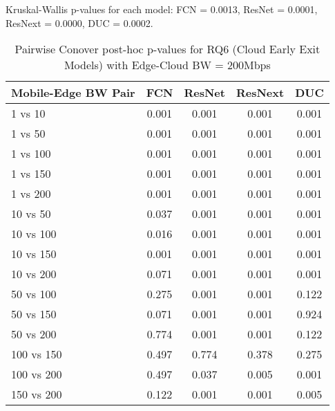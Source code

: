 \begin{table}[h]
\centering
\caption{Pairwise Conover post-hoc p-values for RQ6 (Cloud Early Exit Models) with Edge-Cloud BW = 200Mbps}
\label{tab:conover_cloud_earlyexit_ec200}
\smallskip
Kruskal-Wallis p-values for each model: FCN = 0.0013, ResNet = 0.0001, ResNext = 0.0000, DUC = 0.0002.

\begin{tabular}{lcccc}
\toprule
Mobile-Edge BW Pair & FCN & ResNet & ResNext & DUC \\
\midrule
1 vs 10 & 0.001 & 0.001 & 0.001 & 0.001 \\
1 vs 50 & 0.001 & 0.001 & 0.001 & 0.001 \\
1 vs 100 & 0.001 & 0.001 & 0.001 & 0.001 \\
1 vs 150 & 0.001 & 0.001 & 0.001 & 0.001 \\
1 vs 200 & 0.001 & 0.001 & 0.001 & 0.001 \\
10 vs 50 & 0.037 & 0.001 & 0.001 & 0.001 \\
10 vs 100 & 0.016 & 0.001 & 0.001 & 0.001 \\
10 vs 150 & 0.001 & 0.001 & 0.001 & 0.001 \\
10 vs 200 & 0.071 & 0.001 & 0.001 & 0.001 \\
50 vs 100 & 0.275 & 0.001 & 0.001 & 0.122 \\
50 vs 150 & 0.071 & 0.001 & 0.001 & 0.924 \\
50 vs 200 & 0.774 & 0.001 & 0.001 & 0.122 \\
100 vs 150 & 0.497 & 0.774 & 0.378 & 0.275 \\
100 vs 200 & 0.497 & 0.037 & 0.005 & 0.001 \\
150 vs 200 & 0.122 & 0.001 & 0.001 & 0.005 \\
\bottomrule
\end{tabular}
\end{table}

